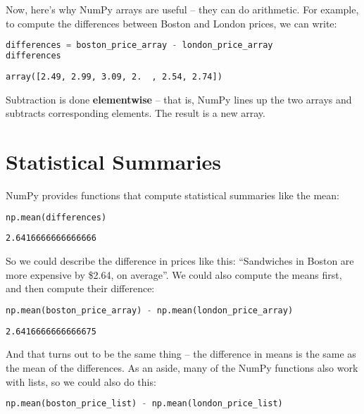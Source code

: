 \documentclass[
]{book}
\begin{document}
Now, here's why NumPy arrays are useful -- they can do arithmetic. For
example, to compute the differences between Boston and London prices, we
can write:

\begin{lstlisting}[language=Python]
differences = boston_price_array - london_price_array
differences
\end{lstlisting}

\begin{lstlisting}
array([2.49, 2.99, 3.09, 2.  , 2.54, 2.74])
\end{lstlisting}

Subtraction is done \textbf{elementwise} -- that is, NumPy lines up the
two arrays and subtracts corresponding elements. The result is a new
array.

\section{Statistical Summaries}\label{statistical-summaries}

NumPy provides functions that compute statistical summaries like the
mean:

\begin{lstlisting}[language=Python]
np.mean(differences)
\end{lstlisting}

\begin{lstlisting}
2.6416666666666666
\end{lstlisting}

So we could describe the difference in prices like this: ``Sandwiches in
Boston are more expensive by \$2.64, on average''. We could also compute
the means first, and then compute their difference:

\begin{lstlisting}[language=Python]
np.mean(boston_price_array) - np.mean(london_price_array)
\end{lstlisting}

\begin{lstlisting}
2.6416666666666675
\end{lstlisting}

And that turns out to be the same thing -- the difference in means is
the same as the mean of the differences. As an aside, many of the NumPy
functions also work with lists, so we could also do this:

\begin{lstlisting}[language=Python]
np.mean(boston_price_list) - np.mean(london_price_list)
\end{lstlisting}
\end{document}
